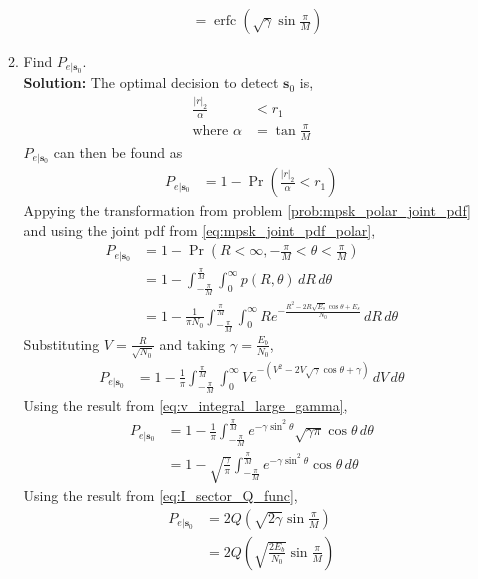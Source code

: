 \documentclass[journal,10pt,twocolumn]{IEEEtran}
\providecommand{\pr}[1]{\ensuremath{\Pr\left(#1\right)}}
\providecommand{\qfunc}[1]{\ensuremath{Q\left(#1\right)}}
\providecommand{\brak}[1]{\ensuremath{\left(#1\right)}}
\providecommand{\abs}[1]{\left\vert#1\right\vert}
\newcommand{\solution}{\noindent \textbf{Solution: }}
\let\vec\mathbf
\begin{document}
\begin{enumerate}
\begin{enumerate}[label=(\alph{enumii})]
\begin{align}
	&= \operatorname{erfc}\left(\sqrt{\gamma}\sin \frac{\pi}{M}\right)
\end{align}
\item Find $P_{e|\mathbf{s}_0}$.\\
\solution The optimal decision to detect $\vec{s}_0$ is,
\begin{align}
	\frac{\abs{r}_2}{\alpha} &< r_1\\
	\nonumber
	\text{where } \alpha &= \tan \frac{\pi}{M} 
\end{align}
$P_{e|\mathbf{s}_0}$ can then be found as 
\begin{align}
	P_{e|\mathbf{s}_0} &= 1 - \pr{\frac{\abs{r}_2}{\alpha} < r_1}
\end{align}
Appying the transformation from problem \ref{prob:mpsk_polar_joint_pdf} and using the joint pdf from \eqref{eq:mpsk_joint_pdf_polar},
\begin{align*}
	P_{e|\mathbf{s}_0} &= 1 - \pr{R < \infty, -\frac{\pi}{M} < \theta < \frac{\pi}{M}}\\
	&= 1 - \int_{-\frac{\pi}{M}}^{\frac{\pi}{M}} \int_{0}^{\infty} p\brak{R,\theta} \,dR  \,d\theta\\ 
	&= 1 - \frac{1}{\pi N_0} \int_{-\frac{\pi}{M}}^{\frac{\pi}{M}} \int_{0}^{\infty} Re^{-\frac{R^2-2R\sqrt{E_s}\cos \theta + E_s}{N_0}} \,dR  \,d\theta
\end{align*}
Substituting $V = \frac{R}{\sqrt{N_0}}$ and taking $\gamma = \frac{E_b}{N_0}$,
\begin{align*}
	P_{e|\mathbf{s}_0} &= 1 - \frac{1}{\pi} \int_{-\frac{\pi}{M}}^{\frac{\pi}{M}} \int_{0}^{\infty} Ve^{-\brak{V^2-2V\sqrt{\gamma}\cos \theta + \gamma}} \,dV  \,d\theta
\end{align*}
Using the result from \eqref{eq:v_integral_large_gamma},
\begin{align*}
	P_{e|\mathbf{s}_0} &= 1 - \frac{1}{\pi} \int_{-\frac{\pi}{M}}^{\frac{\pi}{M}}  e^{-\gamma\sin^2 \theta}\sqrt{\gamma\pi}\cos \theta \,d\theta\\
	&= 1 - \sqrt{\frac{\gamma}{\pi}} \int_{-\frac{\pi}{M}}^{\frac{\pi}{M}}  e^{-\gamma\sin^2 \theta}\cos \theta \,d\theta
\end{align*}
Using the result from \eqref{eq:I_sector_Q_func},
\begin{align}	
	P_{e|\mathbf{s}_0} &= 2\qfunc{\sqrt{2\gamma}\sin \frac{\pi}{M}}\\
	&= 2\qfunc{\sqrt{\frac{2E_b}{N_0}}\sin \frac{\pi}{M}}
\end{align}

\end{enumerate}
\end{enumerate}
\end{document}
